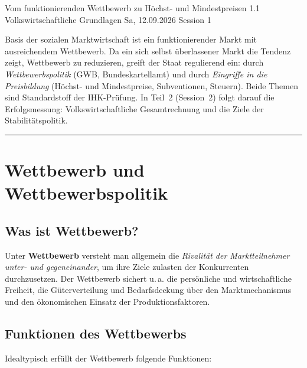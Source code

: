 \documentclass[11pt, a4paper]{article}
\begin{document}
%
  {Vom funktionierenden Wettbewerb zu Höchst- und Mindestpreisen}%
  {1.1 Volkswirtschaftliche Grundlagen}%
  {Sa, 12.09.2026 \textperiodcentered{} Session 1}

\begin{merksatz}[title={\bfseries Worum geht es in Teil 1?}]
Basis der sozialen Marktwirtschaft ist ein funktionierender Markt mit ausreichendem
Wettbewerb. Da ein sich selbst überlassener Markt die Tendenz zeigt, Wettbewerb zu
reduzieren, greift der Staat regulierend ein: durch \emph{Wettbewerbspolitik} (GWB,
Bundeskartellamt) und durch \emph{Eingriffe in die Preisbildung} (Höchst- und
Mindestpreise, Subventionen, Steuern). Beide Themen sind Standardstoff der IHK-Prüfung.
In Teil~2 (Session~2) folgt darauf die Erfolgsmessung: Volkswirtschaftliche
Gesamtrechnung und die Ziele der Stabilitätspolitik.
\end{merksatz}

\tableofcontents
\vspace{1em}
\hrule
\vspace{1em}

\section{Wettbewerb und Wettbewerbspolitik}

\subsection{Was ist Wettbewerb?}

Unter \textbf{Wettbewerb} versteht man allgemein die \emph{Rivalität der Marktteilnehmer
unter- und gegeneinander}, um ihre Ziele zulasten der Konkurrenten durchzusetzen. Der
Wettbewerb sichert u.\,a. die persönliche und wirtschaftliche Freiheit, die
Güterverteilung und Bedarfsdeckung über den Marktmechanismus und den ökonomischen
Einsatz der Produktionsfaktoren.

\subsection{Funktionen des Wettbewerbs}

Idealtypisch erfüllt der Wettbewerb folgende Funktionen:
\end{document}
